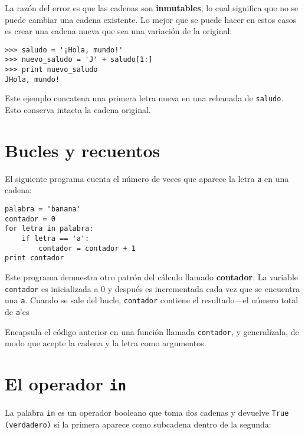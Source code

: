 La razón del error es que las
cadenas son {\bf inmutables}, lo cual significa que no se puede
cambiar una cadena existente. Lo mejor que se puede hacer en estos casos es
crear una cadena nueva que sea una variación de la original:

\beforeverb
\begin{verbatim}
>>> saludo = '¡Hola, mundo!'
>>> nuevo_saludo = 'J' + saludo[1:]
>>> print nuevo_saludo
JHola, mundo!
\end{verbatim}
\afterverb
%
Este ejemplo concatena una primera letra nueva en
una rebanada de {\tt saludo}. Esto conserva intacta
la cadena original.


\section{Bucles y recuentos}
\label{counter}


El siguiente programa cuenta el número de veces que aparece la letra
{\tt a} en una cadena:

\beforeverb
\begin{verbatim}
palabra = 'banana'
contador = 0
for letra in palabra:
    if letra == 'a':
        contador = contador + 1
print contador
\end{verbatim}
\afterverb
%
Este programa demuestra otro patrón del cálculo llamado {\bf contador}.
La variable {\tt contador} es inicializada a 0 y después
es incrementada cada vez que se encuentra una {\tt a}.
Cuando se sale del bucle, {\tt contador}
contiene el resultado---el número total de {\tt a}'es

\begin{ex}

Encapsula el código anterior en una función llamada
{\tt contador}, y generalízala, de modo que acepte la cadena y la
letra como argumentos.
\end{ex}

\section{El operador {\tt in}}
\label{inboth}


La palabra {\tt in} es un operador booleano que toma dos cadenas y
devuelve {\tt True (verdadero)} si la primera aparece como subcadena
dentro de la segunda:


